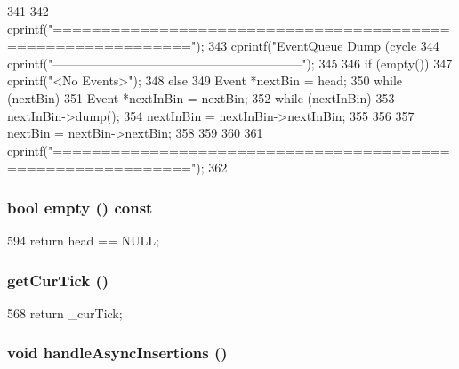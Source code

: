 \begin{DoxyCode}
341 {
342     cprintf("============================================================\n");
343     cprintf("EventQueue Dump  (cycle %
344     cprintf("------------------------------------------------------------\n");
345 
346     if (empty())
347         cprintf("<No Events>\n");
348     else {
349         Event *nextBin = head;
350         while (nextBin) {
351             Event *nextInBin = nextBin;
352             while (nextInBin) {
353                 nextInBin->dump();
354                 nextInBin = nextInBin->nextInBin;
355             }
356 
357             nextBin = nextBin->nextBin;
358         }
359     }
360 
361     cprintf("============================================================\n");
362 }
\end{DoxyCode}
\hypertarget{classEventQueue_ac6e61de369e994009e36f344f99c15ad}{
\subsubsection[{empty}]{\setlength{\rightskip}{0pt plus 5cm}bool empty () const}}
\label{classEventQueue_ac6e61de369e994009e36f344f99c15ad}



\begin{DoxyCode}
594 { return head == NULL; }
\end{DoxyCode}
\hypertarget{classEventQueue_ab9e4d6c1f3218aee0ff70854de959a6c}{
\subsubsection[{getCurTick}]{ getCurTick ()}}
\label{classEventQueue_ab9e4d6c1f3218aee0ff70854de959a6c}



\begin{DoxyCode}
568 { return _curTick; }
\end{DoxyCode}
\hypertarget{classEventQueue_a2f9d0ed8258183804bc764aa3b859f70}{
\subsubsection[{handleAsyncInsertions}]{\setlength{\rightskip}{0pt plus 5cm}void handleAsyncInsertions ()}}
\label{classEventQueue_a2f9d0ed8258183804bc764aa3b859f70}


